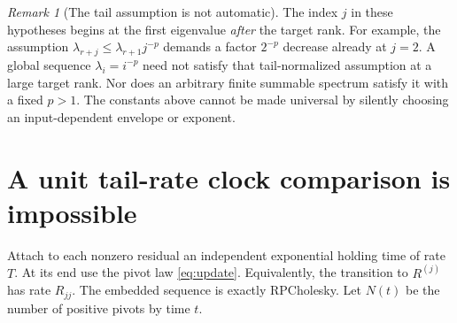 \documentclass[11pt]{article}
\theoremstyle{remark}\newtheorem{remark}[theorem]{Remark}
\begin{document}
\begin{remark}[The tail assumption is not automatic]
The index $j$ in these hypotheses begins at the first eigenvalue \emph{after} the target rank. For example, the assumption $\lambda_{r+j}\le\lambda_{r+1}j^{-p}$ demands a factor $2^{-p}$ decrease already at $j=2$. A global sequence $\lambda_i=i^{-p}$ need not satisfy that tail-normalized assumption at a large target rank. Nor does an arbitrary finite summable spectrum satisfy it with a fixed $p>1$. The constants above cannot be made universal by silently choosing an input-dependent envelope or exponent.
\end{remark}

\section{A unit tail-rate clock comparison is impossible}
Attach to each nonzero residual an independent exponential holding time of rate $T$. At its end use the pivot law \eqref{eq:update}. Equivalently, the transition to $R^{(j)}$ has rate $R_{jj}$. The embedded sequence is exactly RPCholesky. Let $N(t)$ be the number of positive pivots by time $t$.
\end{document}
